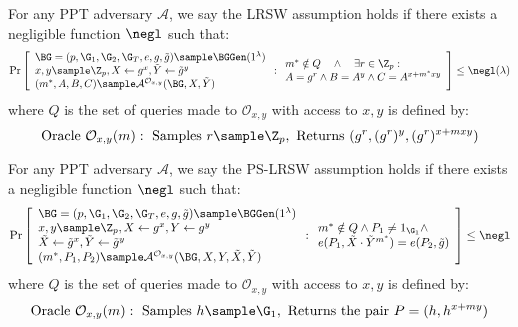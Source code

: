 \begin{definition}
For any PPT adversary $\mathcal{A}$, we say the LRSW assumption holds if there exists a negligible function $\negl$ such that:
$$\Pr\left[\begin{array}{l}
    \BG = (p, \G_1, \G_2, \G_T, e, g, \tilde{g}) \sample \BGGen(1^\lambda) \\
    x,y \sample \Z_p, X \gets g^x, \tilde{Y} \gets \tilde{g}^y \\
    (m^*, A, B, C) \sample \mathcal{A}^{\mathcal{O}_{x,y}}(\BG, X, \tilde{Y})
\end{array} : \begin{array}{l}
    m^* \notin Q \quad \land \quad \exists r \in \Z_p :\\
    A = g^r \land B = A^y \land C = A^{x+m^*xy}
\end{array}\right] \leq \negl(\lambda)$$
where $Q$ is the set of queries made to $\mathcal{O}_{x,y}$ with access to $x,y$ is defined by:
\[
\text{Oracle }\mathcal{O}_{x,y}(m): \text{ Samples } r \sample \Z_p, \text{ Returns } (g^r, (g^r)^y, (g^r)^{x+mxy})
\]
\end{definition}


\begin{definition}
For any PPT adversary $\mathcal{A}$, we say the PS-LRSW assumption holds if there exists a negligible function $\negl$ such that:
$$\Pr\left[\begin{array}{l}
    \BG = (p, \G_1, \G_2, \G_T, e, g, \tilde{g}) \sample \BGGen(1^\lambda) \\
    x,y \sample \Z_p, X \gets g^x, Y \gets g^y \\
    \tilde{X} \gets \tilde{g}^x, \tilde{Y} \gets \tilde{g}^y \\
    (m^*, P_1, P_2) \sample \mathcal{A}^{\mathcal{O}_{x,y}}(\BG, X, Y, \tilde{X}, \tilde{Y})
\end{array} : \begin{array}{l}
    m^* \notin Q \land P_1 \neq 1_{\G_1} \land \\
    e(P_1, \tilde{X} \cdot \tilde{Y}^{m^*}) = e(P_2, \tilde{g})
\end{array}\right] \leq \negl$$
where $Q$ is the set of queries made to $\mathcal{O}_{x,y}$ with access to $x,y$ is defined by:
\[
\text{Oracle }\mathcal{O}_{x,y}(m): \text{ Samples } h \sample \G_1, \text{ Returns the pair }P = (h, h^{x+my})
\]
\end{definition}



